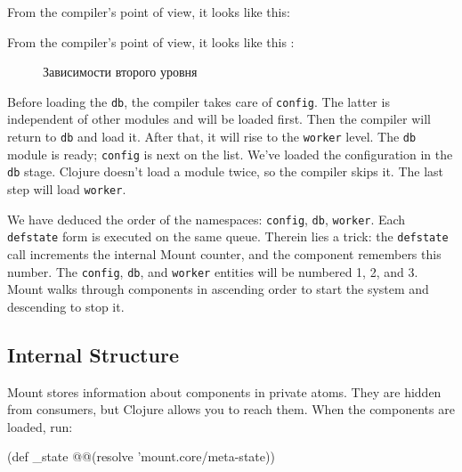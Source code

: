 \ifprint

\noindent
From the compiler's point of view, it looks like this:

\begin{figure}[h!]
\end{figure}

\fi

\ifebook

\noindent
From the compiler's point of view, it looks like this :

\begin{figure}[b!]
  \caption{Зависимости второго уровня}
  \label{fig:chart-sys-3}
\end{figure}

\fi

Before loading the \verb|db|, the compiler takes care of \verb|config|. The latter is independent of other modules and will be loaded first. Then the compiler will return to \verb|db| and load it. After that, it will rise to the \verb|worker| level. The \verb|db| module is ready; \verb|config| is next on the list. We've loaded the configuration in the \verb|db| stage. Clojure doesn't load a module twice, so the compiler skips it. The last step will load \verb|worker|.


We have deduced the order of the namespaces: \verb|config|, \verb|db|, \verb|worker|. Each \verb|defstate| form is executed on the same queue. Therein lies a trick: the \verb|defstate| call increments the internal Mount counter, and the component remembers this number. The \verb|config|, \verb|db|, and \verb|worker| entities will be numbered 1, 2, and 3. Mount walks through components in ascending order to start the system and descending to stop it.

\subsection{Internal Structure}

Mount stores information about components in private atoms. They are hidden from consumers, but Clojure allows you to reach them. When the components are loaded, run:

\ifnarrow

\begin{english}
  \begin{clojure}
(def _state
  @@(resolve 'mount.core/meta-state))
  \end{clojure}
\end{english}

